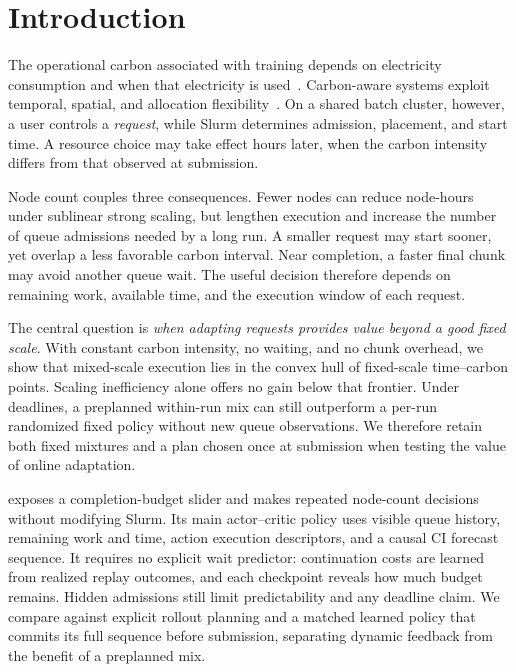 \section{Introduction}

The operational carbon associated with training depends on electricity
consumption and when that electricity is used~\cite{patterson2021carbon}.
Carbon-aware systems exploit temporal, spatial, and allocation
flexibility~\cite{hanafy2023carbonscaler,sukprasert2024limitations}. On a shared
batch cluster, however, a user controls a \emph{request}, while Slurm determines
admission, placement, and start time. A resource choice may take effect hours
later, when the carbon intensity differs from that observed at submission.

Node count couples three consequences. Fewer nodes can reduce node-hours under
sublinear strong scaling, but lengthen execution and increase the number of
queue admissions needed by a long run. A smaller request may start sooner,
yet overlap a less favorable carbon interval. Near completion, a faster final
chunk may avoid another queue wait. The useful decision therefore depends on
remaining work, available time, and the execution window of each request.

The central question is \emph{when adapting requests provides value beyond a
good fixed scale}. With constant carbon intensity, no waiting, and no chunk
overhead, we show that mixed-scale execution lies in the convex hull of
fixed-scale time--carbon points. Scaling inefficiency alone offers no gain
below that frontier. Under deadlines, a preplanned within-run mix can still
outperform a per-run randomized fixed policy without new queue observations.
We therefore retain both fixed mixtures and a plan chosen once at submission
when testing the value of online adaptation.

\name{} exposes a completion-budget slider and makes repeated node-count decisions without
modifying Slurm. Its main actor--critic policy uses visible queue history,
remaining work and time, action execution descriptors, and a causal CI forecast
sequence. It requires no explicit wait predictor: continuation costs are
learned from realized replay outcomes, and each checkpoint reveals how much
budget remains. Hidden admissions still limit predictability and any deadline
claim. We compare against explicit rollout planning and a matched learned policy
that commits its full sequence before submission, separating dynamic feedback
from the benefit of a preplanned mix.

